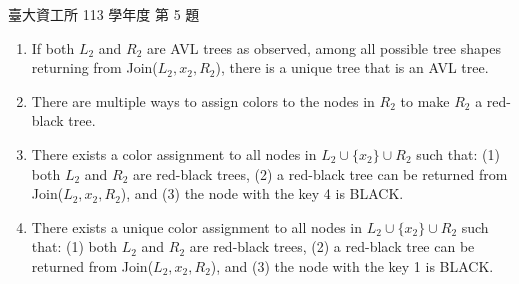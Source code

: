 \begin{pastexam}[label={px:ntu-113-dsa-05}]{臺大資工所 113 學年度 第 5 題}
\begin{enumerate}[label=\Alph*.]
\item If both $L_2$ and $R_2$ are AVL trees as observed, among all possible tree shapes returning
from Join($L_2,x_2,R_2$), there is a unique tree that is an AVL tree.
\item There are multiple ways to assign colors to the nodes in $R_2$ to make $R_2$ a red-black tree.
\item There exists a color assignment to all nodes in $L_2\cup\{x_2\}\cup R_2$ such that: (1) both
$L_2$ and $R_2$ are red-black trees, (2) a red-black tree can be returned from Join($L_2,x_2,R_2$),
and (3) the node with the key 4 is BLACK.
\item There exists a unique color assignment to all nodes in $L_2\cup\{x_2\}\cup R_2$ such that: (1)
both $L_2$ and $R_2$ are red-black trees, (2) a red-black tree can be returned from
Join($L_2,x_2,R_2$), and (3) the node with the key 1 is BLACK.
\end{enumerate}
\end{pastexam}

